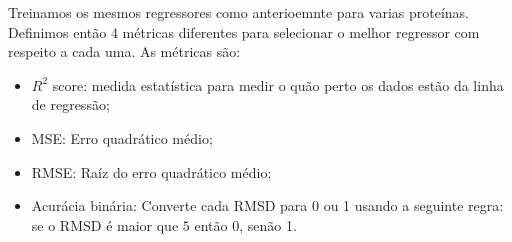 \begin{table}[!htbp]
\begin{tabular}{@{}cccc@{}}
    \bottomrule
\end{tabular}
\end{table}

Treinamos os mesmos regressores como anterioemnte para varias proteínas. Definimos então $4$ métricas diferentes
para selecionar o melhor regressor com respeito a cada uma. As métricas são:
\begin{itemize}
    \item $R^2$ score: medida estatística para medir o quão perto os dados estão da linha de regressão;
    \item MSE: Erro quadrático médio;
    \item RMSE: Raíz do erro quadrático médio;
    \item Acurácia binária: Converte cada RMSD para 0 ou 1 usando a seguinte regra: se o RMSD é maior que
          $5$ então 0, senão 1.
\end{itemize}

